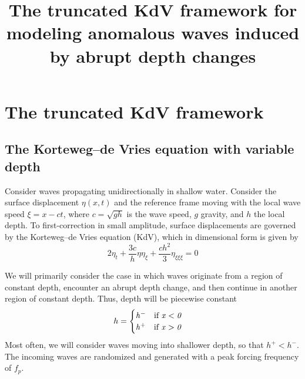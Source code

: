 \documentclass[11pt]{article}
\newcommand{\depth}{h}
\newcommand{\dup}{\depth^{-}}
\newcommand{\ddn}{\depth^{+}}
\newcommand{\freqp}{f_p}
\begin{document}
\title{The truncated KdV framework for modeling anomalous waves induced by abrupt depth changes}

\maketitle



\section{The truncated KdV framework}

\subsection{The Korteweg–de Vries equation with variable depth}
Consider waves propagating unidirectionally in shallow water. Consider the surface displacement $\eta(x,t)$ and the reference frame moving with the local wave speed $\xi = x - ct$, where $c = \sqrt{g \depth}$ is the wave speed, $g$ gravity, and $\depth$ the local depth.
To first-correction in small amplitude, surface displacements are governed by the Korteweg–de Vries equation (KdV), which in dimensional form is given by
\begin{equation}
2 \eta_t + \frac{3 c}{\depth} \eta \eta_{\xi} + \frac{c \depth^2}{3} \eta_{\xi \xi \xi} = 0
\end{equation}

We will primarily consider the case in which waves originate from a region of constant depth, encounter an abrupt depth change, and then continue in another region of constant depth. Thus, depth will be piecewise constant
\begin{align}
\depth = 
\begin{cases}
\it \dup \quad \mbox{if } x<0 \\
\it \ddn \quad \mbox{if } x>0
\end{cases}
\end{align}
Most often, we will consider waves moving into shallower depth, so that $\ddn < \dup$. The incoming waves are randomized and generated with a peak forcing frequency of $\freqp$. 
\end{document}
